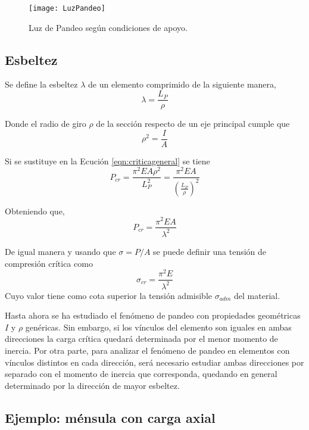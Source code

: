 \begin{figure}[htb]
	\centering
	\texttt{[image: LuzPandeo]}
	\caption{Luz de Pandeo según condiciones de apoyo.}
	\label{fig:luzpandeo}
\end{figure}

\subsection{Esbeltez}

Se define la esbeltez $\lambda$ de un elemento comprimido de la siguiente manera,
\begin{equation}
\lambda = \frac{L_P}{\rho}
\end{equation}

Donde el radio de giro $\rho$ de la sección respecto de un eje principal cumple que
\begin{equation}
\rho^2 = \frac{I}{A}
\end{equation}

Si se sustituye en la Ecución \eqref{eqn:criticageneral} se tiene
$$
P_{cr} = \frac{\pi^2 E A \rho^2}{L_P^2} = \frac{\pi^2 E A}{\left(\frac{L_P}{\rho}\right)^2}
$$

Obteniendo que,
\begin{equation}
\boxed{P_{cr} = \frac{\pi^2 E A}{\lambda^2}}
\end{equation}

De igual manera y usando que $\sigma=P/A$ se puede definir una tensión de compresión crítica como  
\begin{equation}
\boxed{\sigma_{cr} = \frac{\pi^2 E}{\lambda^2}}
\end{equation}
Cuyo valor tiene como cota superior la tensión admisible $\sigma_{adm}$ del material.

Hasta ahora se ha estudiado el fenómeno de pandeo con propiedades geométricas $I$ y $\rho$ genéricas. Sin embargo, si los vínculos del elemento son iguales en ambas direcciones la carga crítica quedará determinada por el menor momento de inercia. Por otra parte, para analizar el fenómeno de pandeo en elementos con vínculos distintos en cada dirección, será necesario estudiar ambas direcciones por separado con el momento de inercia que corresponda, quedando en general determinado por la dirección de mayor esbeltez.

\subsection{Ejemplo: ménsula con carga axial}

